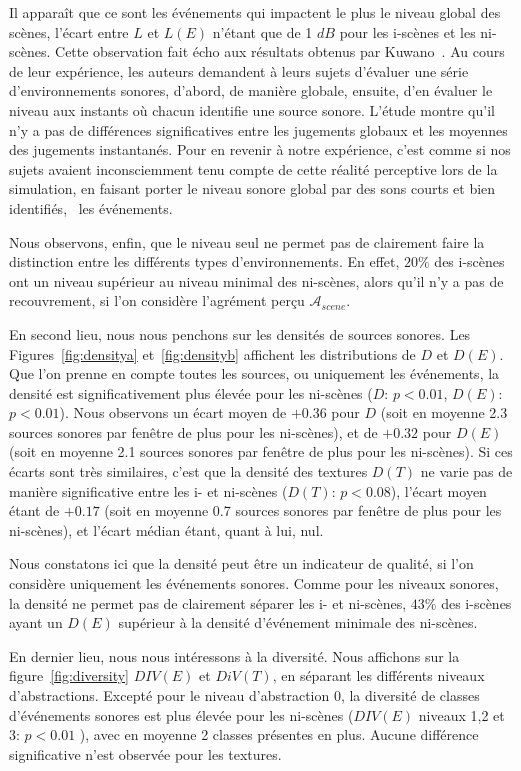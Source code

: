Il apparaît que ce sont les événements qui impactent le plus le niveau global des scènes, l'écart entre $L$ et $L(E)$ n'étant que de 1 $dB$ pour les i-scènes et les ni-scènes. Cette observation fait écho aux résultats obtenus par Kuwano~\al \citep{kuwano_memory_2003}. Au cours de leur expérience, les auteurs demandent à leurs sujets d'évaluer une série d'environnements sonores, d'abord, de manière globale, ensuite, d'en évaluer le niveau aux instants où chacun identifie une source sonore. L'étude montre qu'il n'y a pas de différences significatives entre les jugements globaux et les moyennes des jugements instantanés. Pour en revenir à notre expérience, c'est comme si nos sujets avaient inconsciemment tenu compte de cette réalité perceptive lors de la simulation, en faisant porter le niveau sonore global par des sons courts et bien identifiés, \ie~les événements.

Nous observons, enfin, que le niveau seul ne permet pas de clairement faire la distinction entre les différents types d'environnements. En effet, $20\%$ des i-scènes ont un niveau supérieur au niveau minimal des ni-scènes, alors qu'il n'y a pas de recouvrement, si l'on considère l'agrément perçu $\mathcal{A}_{scene}$.

En second lieu, nous nous penchons sur les densités de sources sonores. Les Figures~\ref{fig:densitya} et~\ref{fig:densityb} affichent les distributions de $D$ et $D(E)$. Que l'on prenne en compte toutes les sources, ou uniquement les événements, la densité est significativement plus élevée pour les ni-scènes ($D$: $p<0.01$, $D(E)$: $p<0.01$). Nous observons un écart moyen de $+0.36$ pour $D$ (soit en moyenne 2.3 sources sonores par fenêtre de plus pour les ni-scènes), et de $+0.32$ pour $D(E)$ (soit en moyenne 2.1 sources sonores par fenêtre de plus pour les ni-scènes). Si ces écarts sont très similaires, c'est que la densité des textures $D(T)$ ne varie pas de manière significative entre les i- et ni-scènes ($D(T)$: $p<0.08$), l'écart moyen étant de $+0.17$ (soit en moyenne 0.7 sources sonores par fenêtre de plus pour les ni-scènes), et l'écart médian étant, quant à lui, nul.

Nous constatons ici que la densité peut être un indicateur de qualité, si l'on considère uniquement les événements sonores. Comme pour les niveaux sonores, la densité ne permet pas de clairement séparer les i- et ni-scènes,  $43\%$ des i-scènes ayant un $D(E)$ supérieur à la densité d'événement minimale des ni-scènes.

En dernier lieu, nous nous intéressons à la diversité. Nous affichons sur la figure~\ref{fig:diversity} $DIV(E)$ et $DiV(T)$, en séparant les différents niveaux d'abstractions. Excepté pour le niveau d'abstraction 0, la diversité de classes d'événements sonores est plus élevée pour les ni-scènes ($DIV(E)$ niveaux 1,2 et 3: $p<0.01$ ), avec en moyenne 2 classes présentes en plus. Aucune différence significative n'est observée pour les textures.

